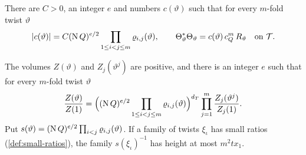 \begin{theorem}\label{thm:chain-norm}
There are $C>0$, an integer $e$ and numbers $c(\vartheta)$ such that for every $m$-fold twist $\vartheta$
\[
  \lvert c(\vartheta)\rvert=C(\operatorname{N} Q)^{e/2}\prod_{1\le i<j\le m}\varrho_{i,j}(\vartheta),\qquad\Theta_\vartheta^*\Theta_\vartheta=c(\vartheta)\,c_Q^m\,R_\vartheta\quad\text{on }\mathcal T.
\]
\end{theorem}

\begin{theorem}\label{thm:factorisation}
The volumes $Z(\vartheta)$ and $Z_j(\vartheta^j)$ are positive, and there is an integer $e$ such that for every $m$-fold twist $\vartheta$
\[
  \frac{Z(\vartheta)}{Z(1)}=\Bigl((\operatorname{N} Q)^{e/2}\prod_{1\le i<j\le m}\varrho_{i,j}(\vartheta)\Bigr)^{d_T}\prod_{j=1}^m\frac{Z_j(\vartheta^j)}{Z_j(1)}.
\]
Put $s(\vartheta)=(\operatorname{N} Q)^{e/2}\prod_{i<j}\varrho_{i,j}(\vartheta)$. If a family of twists $\xi_\iota$ has small ratios (\cref{def:small-ratios}), the family $s(\xi_\iota)^{-1}$ has height at most
$m^2tx_1$.
\end{theorem}

